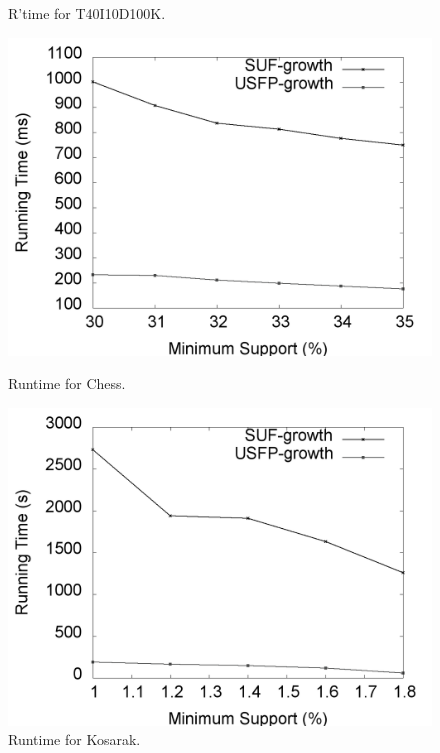 \documentclass[10pt, conference, compsocconf]{IEEEtran}
\begin{document}
\begin{figure}[t]
\begin{minipage}{0.24\linewidth}
		\vspace*{-7mm}
		\caption{R'time for T40I10D100K.}
		\label{result:g_t10_total}
    \end{minipage}
	\begin{minipage}{0.24\linewidth}
		\centering
		\includegraphics[width=\textwidth]{images/result/g_chess_total}
		\vspace*{-7mm}
		\caption{Runtime for Chess.}
		\label{result:g_chess_total}
	\end{minipage}%
	\begin{minipage}{0.24\linewidth}
	   \centering
	   \includegraphics[width=\textwidth]{images/result/g_k_total}
		\vspace*{-7mm}
	   \caption{Runtime for Kosarak.}
	   \label{result:g_k_total}
	\end{minipage}
\end{figure}
\end{document}
